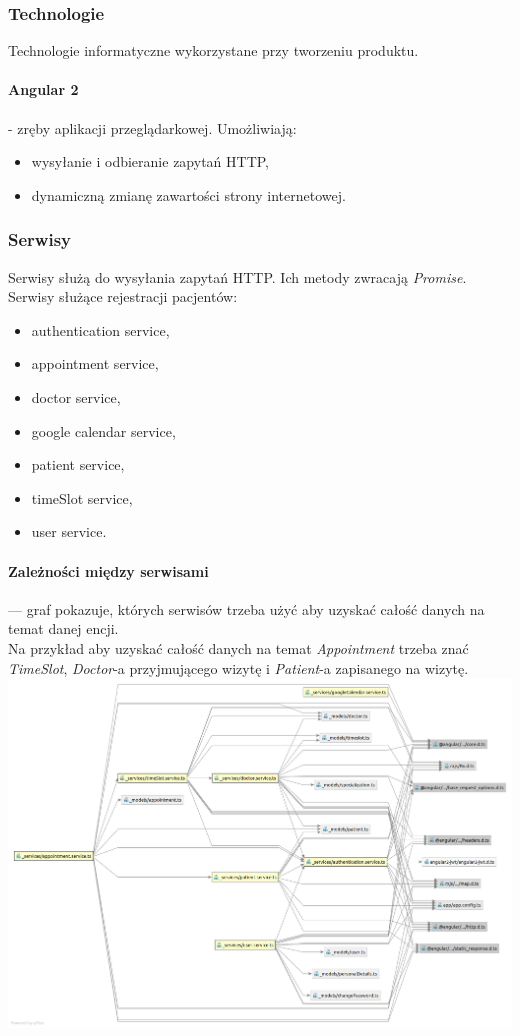 \documentclass[polish,12pt]{aghthesis}
\begin{document}
\subsubsection{Technologie}
Technologie informatyczne wykorzystane przy tworzeniu produktu.
\paragraph{Angular 2} - zręby aplikacji przeglądarkowej. Umożliwiają:
\begin{itemize}
    \item wysyłanie i odbieranie zapytań HTTP,
    \item dynamiczną zmianę zawartości strony internetowej.
\end{itemize}
\subsubsection{Serwisy}
Serwisy służą do wysyłania zapytań HTTP. Ich metody zwracają \emph{Promise}. Serwisy służące rejestracji pacjentów:
\begin{itemize}
    \item authentication service,
    \item appointment service,
    \item doctor service,
    \item google calendar service,
    \item patient service,
    \item timeSlot service,
    \item user service.
\end{itemize}
\paragraph{Zależności między serwisami} ---
 graf pokazuje, których serwisów trzeba użyć aby uzyskać całość danych na temat danej encji. \\
 Na przykład aby uzyskać całość danych na temat \emph{Appointment} trzeba znać \emph{TimeSlot}, \emph{Doctor}-a przyjmującego wizytę i \emph{Patient}-a zapisanego na wizytę.
 \includegraphics[width=\textwidth]{services-dep}
\end{document}
